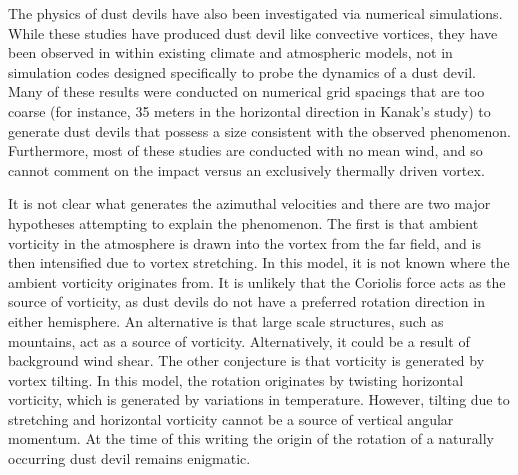 
The physics of dust devils have also been investigated via numerical
simulations. While these studies have produced dust
devil like convective vortices, they have been observed in within
existing climate and atmospheric
models\cite{QJ:QJ200513160722,doi:10.3137/ao.420105}, not 
in simulation codes designed specifically to probe the dynamics of a
dust devil. Many of these results were conducted on numerical grid
spacings that are too coarse (for instance, 35 meters in the horizontal
direction in Kanak's study\cite{kanak2000formation}) to generate dust
devils that possess a size consistent with the observed phenomenon.  
Furthermore, most of these studies are conducted with no mean wind, and
so cannot comment on the impact versus an exclusively thermally driven
vortex\cite{ohno2010mechanisms}. 

It is not clear what generates the azimuthal velocities and there are 
two major hypotheses attempting to explain the phenomenon.
The first is 
that ambient vorticity in the atmosphere is drawn into the vortex from
the far field, and is then intensified due to vortex
stretching\cite{ROG:ROG1635}. In this model, it is not known where 
the ambient vorticity originates from. It is unlikely that the 
Coriolis force acts as the source of vorticity, as
dust devils do not have a preferred rotation direction in either hemisphere. 
An alternative is that large scale structures, such as mountains, act as a 
source of vorticity. Alternatively, it could be a result of background wind shear. 
The other conjecture is that vorticity is generated by vortex tilting. 
In this model, the rotation originates by twisting horizontal 
vorticity, which is generated by variations in 
temperature\cite{renno2004matador}. %
However, tilting due to stretching and horizontal vorticity
cannot be a source of vertical angular momentum. 
At the time of this writing the origin of
the rotation of a naturally occurring dust devil remains
enigmatic.  

%
%

%
%

